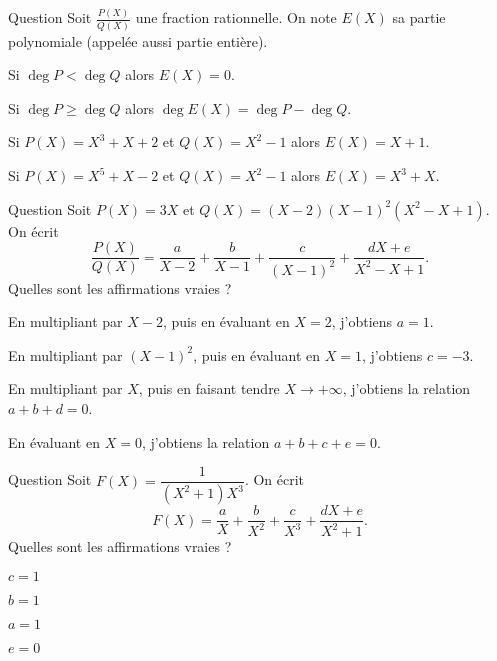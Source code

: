 \begin{multi}[multiple,feedback=
{La partie entière s'obtient comme le quotient de la division euclidienne de \(P\) par \(Q\).
}]{Question}
Soit \(\frac{P(X)}{Q(X)}\) une fraction rationnelle. On note \(E(X)\) sa partie polynomiale (appelée aussi partie entière).

    \item* Si \(\deg P < \deg Q\) alors \(E(X) = 0\).
    \item* Si \(\deg P \ge \deg Q\) alors \(\deg E(X) = \deg P - \deg Q\).
    \item Si \(P(X) = X^3+X+2\) et \(Q(X) = X^2-1\) alors \(E(X) = X+1\).
    \item* Si \(P(X) = X^5+X-2\) et \(Q(X) = X^2-1\) alors \(E(X) = X^3+X\).
\end{multi}


\begin{multi}[multiple,feedback=
{\(\frac{P(X)}{Q(X)} = \frac{3X}{(X-2)(X-1)^2(X^2-X+1)}
=\frac{2}{X-2} + \frac{-3}{X-1} +  \frac{-3}{(X-1)^2}
+ \frac{X+1}{X^2-X+1}\).
}]{Question}
Soit \(P(X)=3X\) et \(Q(X) = (X-2)(X-1)^2(X^2-X+1)\).
On écrit 
\[\frac{P(X)}{Q(X)} = \frac{a}{X-2} + \frac{b}{X-1} +  \frac{c}{(X-1)^2}
+ \frac{dX+e}{X^2-X+1}.\]
Quelles sont les affirmations vraies ?

    \item En multipliant par \(X-2\), puis en évaluant en \(X=2\), j'obtiens \(a=1\).
    \item* En multipliant par \((X-1)^2\), puis en évaluant en \(X=1\), j'obtiens \(c=-3\).
    \item* En multipliant par \(X\), puis en faisant tendre \(X \to +\infty\), j'obtiens la relation \(a+b+d=0\).
    \item En évaluant en \(X=0\), j'obtiens la relation \(a+b+c+e=0\).
\end{multi}


\begin{multi}[multiple,feedback=
{On profite que \(F\) est impaire pour déduire \(b=0\), \(e=0\).
\(F(X) = \dfrac{1}{(X^2+1)X^3} = \frac{-1}{X}  +  \frac{1}{X^3}
+ \frac{X}{X^2+1}.\)
}]{Question}
Soit \(F(X) = \dfrac{1}{(X^2+1)X^3}\).
On écrit 
\[F(X) = \frac{a}{X} + \frac{b}{X^2} +  \frac{c}{X^3}
+ \frac{dX+e}{X^2+1}.\]
Quelles sont les affirmations vraies ?

    \item* \(c=1\)
    \item \(b=1\)
    \item \(a=1\)
    \item* \(e=0\)
\end{multi}


